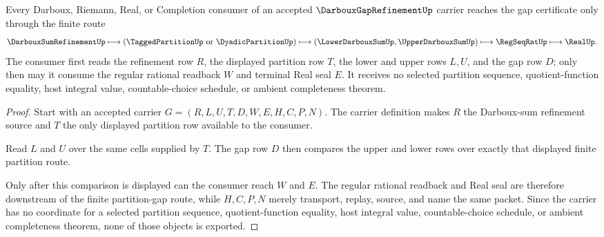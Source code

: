 \begin{theorem}
\label{thm:darboux-gap-refinement-partition-route}
Every Darboux, Riemann, Real, or Completion consumer of an accepted $\DarbouxGapRefinementUp$ carrier reaches the gap certificate only through the finite route
$$
\DarbouxSumRefinementUp \longmapsto (\TaggedPartitionUp \ \mathrm{or}\ \DyadicPartitionUp) \longmapsto (\LowerDarbouxSumUp,\UpperDarbouxSumUp) \longmapsto \RegSeqRatUp \longmapsto \RealUp .
$$
The consumer first reads the refinement row $R$, the displayed partition row $T$, the lower and upper rows $L,U$, and the gap row $D$; only then may it consume the regular rational readback $W$ and terminal Real seal $E$. It receives no selected partition sequence, quotient-function equality, host integral value, countable-choice schedule, or ambient completeness theorem.
\end{theorem}
\begin{proof}
Start with an accepted carrier $G=(R,L,U,T,D,W,E,H,C,P,N)$. The carrier definition makes $R$ the Darboux-sum refinement source and $T$ the only displayed partition row available to the consumer.

Read $L$ and $U$ over the same cells supplied by $T$. The gap row $D$ then compares the upper and lower rows over exactly that displayed finite partition route.

Only after this comparison is displayed can the consumer reach $W$ and $E$. The regular rational readback and Real seal are therefore downstream of the finite partition-gap route, while $H,C,P,N$ merely transport, replay, source, and name the same packet. Since the carrier has no coordinate for a selected partition sequence, quotient-function equality, host integral value, countable-choice schedule, or ambient completeness theorem, none of those objects is exported.
\end{proof}




